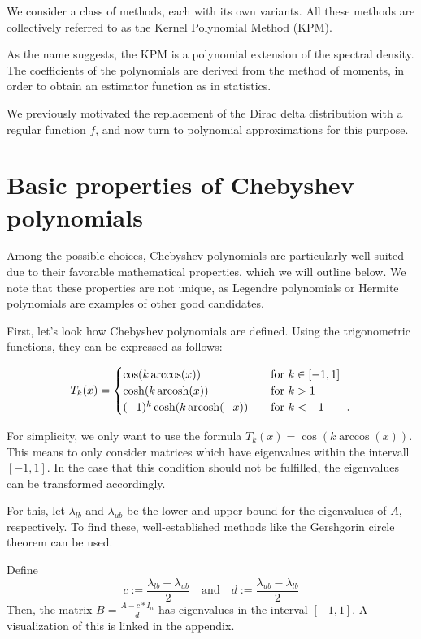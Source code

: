 We consider a class of methods, each with its own variants.
All these methods are collectively referred to as the Kernel Polynomial Method (KPM).

As the name suggests, the KPM is a polynomial extension of the spectral density.
The coefficients of the polynomials are derived from the method of moments,
in order to obtain an estimator function as in statistics.

We previously motivated the replacement of the Dirac delta distribution with a regular function $f$,
and now turn to polynomial approximations for this purpose.

\section{Basic properties of Chebyshev polynomials}
Among the possible choices, Chebyshev polynomials are particularly well-suited due to their favorable mathematical properties, which we will outline below. We note that these properties are not unique, as Legendre polynomials or Hermite polynomials are examples of other good candidates.

First, let's look how Chebyshev polynomials are defined.
Using the trigonometric functions, they can be expressed as follows:

\[ T_k(x) =
\begin{cases}

\cos(k \arccos(x))                & \quad \text{for } k \in [-1, 1]\\
    \cosh(k \operatorname{arcosh}(x))           & \quad \text{for } k > 1\\
    (-1)^k \cosh(k \operatorname{arcosh}(-x))   & \quad \text{for } k < -1 \quad \quad .
\end{cases}
\]

For simplicity, we only want to use the formula $T_k(x) = \cos(k \arccos(x))$.
This means to only consider matrices which have eigenvalues within the intervall $[-1, 1]$.
In the case that this condition should not be fulfilled, the eigenvalues can be transformed accordingly.

For this, let $\lambda_{lb}$ and $\lambda_{ub}$ be the lower and upper bound for the eigenvalues of $A$, respectively.
To find these, well-established methods like the Gershgorin circle theorem can be used.

Define
\[
c := \frac{\lambda_{lb} + \lambda_{ub}}{2} \quad \text{and} \quad d := \frac{\lambda_{ub} - \lambda_{lb}}{2}
\]
Then, the matrix $B = \frac{A - c*I_n}{d}$ has eigenvalues in the interval $[-1, 1]$.
A visualization of this is linked in the appendix.

